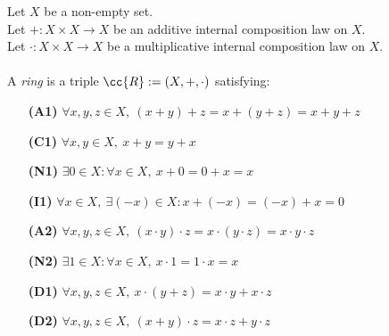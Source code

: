 \begin{definition-pre}[Ring]
    \label{def:ring}
    Let \(X\) be a non-empty set. \\
    Let \(+: X\times X \to X\) be an additive internal composition law on \(X\). \\
    Let \(\cdot: X\times X \to X\) be a multiplicative internal composition law on \(X\). \\\\
    A \textit{ring} is a triple \(\cc{R}:= (X, +, \cdot)\) satisfying:
    \begin{enumerate}
        \item [\textbf{(A1)}] \(\forall x,y,z\in X,\ (x+y)+z= x+(y+z) = x+y+z\)
        \item [\textbf{(C1)}] \(\forall x,y\in X,\ x+y = y+x\)
        \item [\textbf{(N1)}] \(\exists 0 \in X : \forall x \in X,\ x+0 = 0+x = x\)
        \item [\textbf{(I1)}] \(\forall x \in X,\ \exists (-x)\in X: x+(-x) = (-x)+x = 0\)
        \item [\textbf{(A2)}] \(\forall x,y,z\in X,\ (x\cdot y)\cdot z= x\cdot(y\cdot z) = x\cdot y\cdot z\)
        \item [\textbf{(N2)}] \(\exists 1 \in X : \forall x \in X,\ x\cdot1 = 1\cdot x = x\)
        \item [\textbf{(D1)}] \(\forall x,y,z \in X,\ x\cdot(y+z)=x\cdot y+x\cdot z\)
        \item [\textbf{(D2)}] \(\forall x,y,z \in X,\ (x+y)\cdot z=x\cdot z+y\cdot z\)
    \end{enumerate}
\end{definition-pre}
